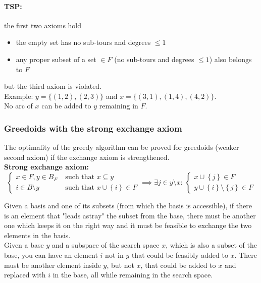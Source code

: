\documentclass[11pt]{article}
\begin{document}
	\vfill
	
	\paragraph{TSP:} the first two axioms hold
	\begin{itemize}
		\item the empty set has no sub-tours and degrees $\leq 1$
		\item any proper subset of a set $\in F$ (no sub-tours and degrees $\leq 1$) also belongs to $F$
	\end{itemize}
	but the third axiom is violated.\\
	Example: $y = \{(1, 2), (2, 3)\}$ and $x = \{(3, 1), (1, 4), (4, 2)\}$.\\
	No arc of $x$ can be added to $y$ remaining in $F$.\\
	
	\newpage
	
	\subsubsection{Greedoids with the strong exchange axiom}
	The optimality of the greedy algorithm can be proved for greedoids (weaker second axiom) if the exchange axiom is strengthened.\\
	
	\textbf{Strong exchange axiom:}
	$$ 
	\begin{cases}
		x \in F, y \in B_F & \text{ such that } x \subseteq y \\
		i \in B \setminus y & \text{ such that } x \cup \left\{i\right\} \in F
	\end{cases}
	\implies \exists j \in y \setminus x: \, 
	\begin{cases}
		x \cup \left\{j\right\} \in F \\
		y \cup \left\{i\right\} \setminus \left\{j\right\} \in F
	\end{cases}
	$$
	
	Given a basis and one of its subsets (from which the basis is accessible), if there is an element that "leads astray" the subset from the base, there must be another one which keeps it on the right way and it must be feasible to exchange the two elements in the basis.\\
	
	Given a base $y$ and a subspace of the search space $x$, which is also a subset of the base, you can have an element $i$ not in $y$ that could be feasibly added to $x$. There must be another element inside $y$, but not $x$, that could be added to $x$ and replaced with $i$ in the base, all while remaining in the search space.\\
	
\end{document}
